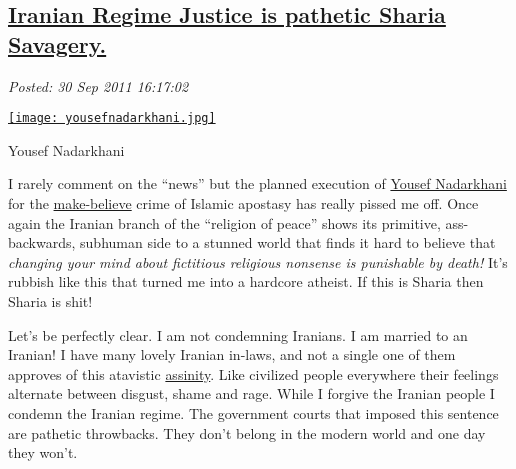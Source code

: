%

\subsection*{\href{http://bakerjd99.wordpress.com/2011/09/30/iranian-regime-justice-is-pathetic-sharia-savagery/}{Iranian Regime Justice is pathetic Sharia Savagery.}}


\noindent\emph{Posted: 30 Sep 2011 16:17:02}
\vspace{6pt}


\captionsetup[floatingfigure]{labelformat=empty}
\begin{floatingfigure}[l]{0.25\textwidth}
\centering
\href{http://bakerjd99.files.wordpress.com/2011/09/yousefnadarkhani.jpg}{\texttt{[image: yousefnadarkhani.jpg]}}
\caption{Yousef  Nadarkhani}
\label{fig:1952X0}
\end{floatingfigure}I rarely comment on the ``news'' but the planned execution of
\href{http://michellemalkin.com/2011/09/29/iranian-pastor-yousef-nadarkhani-faces-execution-for-refusing-to-renounce-christianity-where-are-the-hollyweirdos-and-euroweenies-now/}{Yousef
Nadarkhani} for
the \href{http://bakerjd99.wordpress.com/2009/10/26/counting-gods/}{make-believe}
crime of Islamic apostasy has really pissed me off. Once again the
Iranian branch of the ``religion of peace'' shows its primitive,
ass-backwards, subhuman side to a stunned world that finds it hard to
believe that \emph{changing your mind about fictitious religious
nonsense is punishable by death!} It's rubbish like this that turned me
into a hardcore atheist. If this is Sharia then Sharia is shit!

Let's be perfectly clear. I am not condemning Iranians. I am married to
an Iranian! I have many lovely Iranian in-laws, and not a single one of
them approves of this atavistic
\href{http://www.urbandictionary.com/define.php?term=Assinity}{assinity}.
Like civilized people everywhere their feelings alternate between
disgust, shame and rage. While I forgive the Iranian people I condemn
the Iranian regime. The government courts that imposed this sentence are
pathetic throwbacks. They don't belong in the modern world and one day
they won't.

